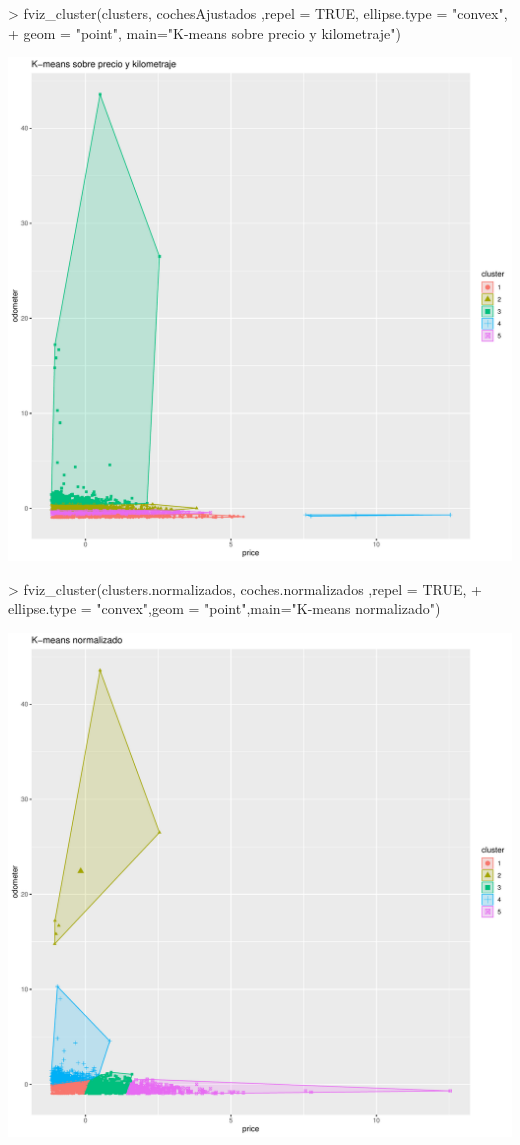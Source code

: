 \documentclass[a4paper]{article}
\begin{document}
\begin{Schunk}
\begin{Sinput}
> fviz_cluster(clusters, cochesAjustados ,repel = TRUE, ellipse.type = "convex",
+              geom = "point", main="K-means sobre precio y kilometraje")
\end{Sinput}
\end{Schunk}
\includegraphics{Practica4-kmean}

\begin{Schunk}
\begin{Sinput}
> fviz_cluster(clusters.normalizados, coches.normalizados ,repel = TRUE, 
+              ellipse.type = "convex",geom = "point",main="K-means normalizado")
\end{Sinput}
\end{Schunk}
\includegraphics{Practica4-kmeannorm}
\end{document}
